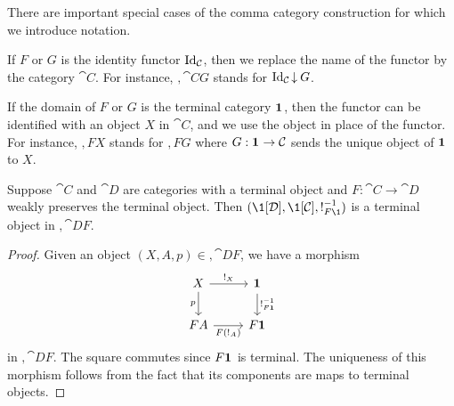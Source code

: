 There are important special cases of the comma category construction for which we introduce notation.
\begin{notn}
\hfill \vspace{-3pt}
\begin{items}
\item If $F$ or $G$ is the identity functor $\idfunc[\cat{C}]$, then we replace the name of the functor by the category $\cat{C}$. For instance, $\comma{\cat{C}}{G}$ stands for $\comma{\idfunc[\cat{C}]}{G}$.
\item If the domain of $F$ or $G$ is the terminal category $\mathbf{1}_{}$, then the functor can be identified with an object $X$ in $\cat{C}$, and we use the object in place of the functor. For instance, $\comma{F}{X}$ stands for $\comma{F}{G}$ where $G : \mathbf{1}_{} \to \mathcal{C}$ sends the unique object of $\mathbf{1}_{}$ to $X$.
\end{items}
\end{notn}

\begin{lem}
Suppose $\cat{C}$ and $\cat{D}$ are categories with a terminal object and $F : \cat{C} \to \cat{D}$ weakly preserves the terminal object. Then $(\1[\cat{D}], \1[\cat{C}], \inv{\mterm[F\1]})$ is a terminal object in $\comma{\cat{D}}{F}$.
\begin{proof}
Given an object $(X, A, p) \in \comma{\cat{D}}{F}$, we have a morphism
\[\begin{tikzcd}
	X & \1 \\
	FA & F\1
	\arrow["{\inv{\mterm[F\1]}}", from=1-2, to=2-2]
	\arrow["p"', from=1-1, to=2-1]
	\arrow["{F(\mterm[A])}"', from=2-1, to=2-2]
	\arrow["{\mterm[X]}", from=1-1, to=1-2]
\end{tikzcd}\]
in $\comma{\cat{D}}{F}$. The square commutes since $F\mathbf{1}_{}$ is terminal. The uniqueness of this morphism follows from the fact that its components are maps to terminal objects.
\end{proof}
\end{lem}


